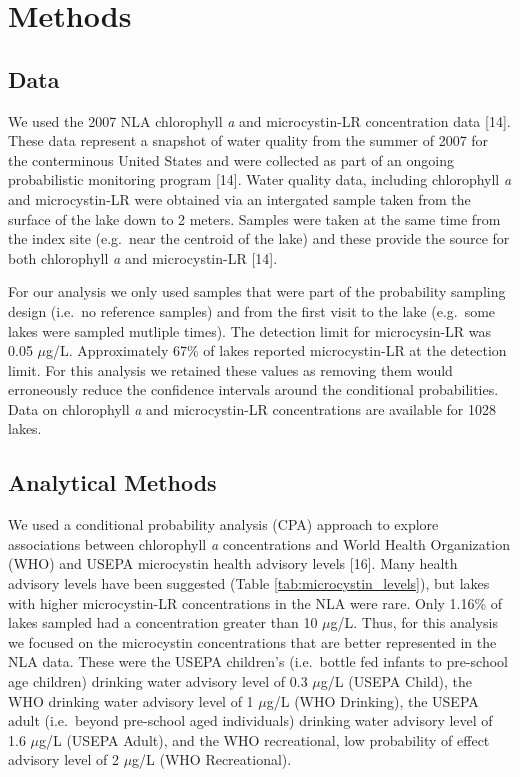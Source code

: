 \documentclass[11pt,]{article}
\begin{document}
\section{Methods}\label{methods}

\subsection{Data}\label{data}

We used the 2007 NLA chlorophyll \emph{a} and microcystin-LR
concentration data {[}14{]}. These data represent a snapshot of water
quality from the summer of 2007 for the conterminous United States and
were collected as part of an ongoing probabilistic monitoring program
{[}14{]}. Water quality data, including chlorophyll \emph{a} and
microcystin-LR were obtained via an intergated sample taken from the
surface of the lake down to 2 meters. Samples were taken at the same
time from the index site (e.g.~near the centroid of the lake) and these
provide the source for both chlorophyll \emph{a} and microcystin-LR
{[}14{]}.

For our analysis we only used samples that were part of the probability
sampling design (i.e.~no reference samples) and from the first visit to
the lake (e.g.~some lakes were sampled mutliple times). The detection
limit for microcysin-LR was 0.05 \(\mu\)g/L. Approximately 67\% of lakes
reported microcystin-LR at the detection limit. For this analysis we
retained these values as removing them would erroneously reduce the
confidence intervals around the conditional probabilities. Data on
chlorophyll \emph{a} and microcystin-LR concentrations are available for
1028 lakes.

\subsection{Analytical Methods}\label{analytical-methods}

We used a conditional probability analysis (CPA) approach to explore
associations between chlorophyll \emph{a} concentrations and World
Health Organization (WHO) and USEPA microcystin health advisory levels
{[}16{]}. Many health advisory levels have been suggested (Table
\ref{tab:microcystin_levels}), but lakes with higher microcystin-LR
concentrations in the NLA were rare. Only 1.16\% of lakes sampled had a
concentration greater than 10 \(\mu\)g/L. Thus, for this analysis we
focused on the microcystin concentrations that are better represented in
the NLA data. These were the USEPA children's (i.e.~bottle fed infants
to pre-school age children) drinking water advisory level of 0.3
\(\mu\)g/L (USEPA Child), the WHO drinking water advisory level of 1
\(\mu\)g/L (WHO Drinking), the USEPA adult (i.e.~beyond pre-school aged
individuals) drinking water advisory level of 1.6 \(\mu\)g/L (USEPA
Adult), and the WHO recreational, low probability of effect advisory
level of 2 \(\mu\)g/L (WHO Recreational).
\end{document}
